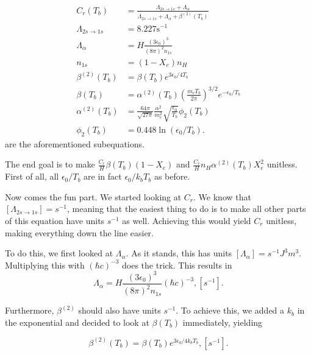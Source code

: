 \documentclass[12pt]{article}
\begin{document}
\begin{align*}\label{eq: peebles components again}
        C_{r}\left(T_{b}\right) &=\frac{\Lambda_{2 s \rightarrow 1 s}+\Lambda_{\alpha}}{\Lambda_{2 s \rightarrow 1 s}+\Lambda_{\alpha}+\beta^{(2)}\left(T_{b}\right)} \\
        \Lambda_{2 s \rightarrow 1 s} &=8.227 \mathrm{s}^{-1} \\
        \Lambda_{\alpha} &=H \frac{\left(3 \epsilon_{0}\right)^{3}}{(8 \pi)^{2} n_{1 s}} \\
        n_{1 s} &=\left(1-X_{e}\right) n_{H} \\
        \beta^{(2)}\left(T_{b}\right) &=\beta\left(T_{b}\right) e^{3 \epsilon_{0} / 4 T_{b}} \\
        \beta\left(T_{b}\right) &=\alpha^{(2)}\left(T_{b}\right)\left(\frac{m_{e} T_{b}}{2 \pi}\right)^{3 / 2} e^{-\epsilon_{0} / T_{b}} \\
        \alpha^{(2)}\left(T_{b}\right) &=\frac{64 \pi}{\sqrt{27 \pi}} \frac{\alpha^{2}}{m_{e}^{2}} \sqrt{\frac{\epsilon_{0}}{T_{b}}} \phi_{2}\left(T_{b}\right) \\
        \phi_{2}\left(T_{b}\right) &=0.448 \ln \left(\epsilon_{0} / T_{b}\right).
\end{align*}
are the aforementioned subequations.

The end goal is to make $\frac{C_r}{H}\beta(T_b)(1-X_e)$ and $\frac{C_r}{H}n_H\alpha^{(2)}(T_b)X_e^2$ unitless. First of all, all $\epsilon_0/T_b$ are in fact $\epsilon_0/k_b T_b$ as before. 

Now comes the fun part. We started looking at $C_r$. We know that $[\Lambda_{2s\rightarrow1s}] = s^{-1}$, meaning that the easiest thing to do is to make all other parts of this equation have units $s^{-1}$ as well. Achieving this would yield $C_r$ unitless, making everything down the line easier. 

To do this, we first looked at $\Lambda_{\alpha}$. As it stands, this has units $[\Lambda_{\alpha}]=s^{-1}J^3m^3$. Multiplying this with $(\hbar c)^{-3}$ does the trick. This results in 
\begin{equation*}
    \Lambda_{\alpha}= H\frac{(3\epsilon_0)^3}{(8\pi)^2 n_{1s}}(\hbar c)^{-3}, [s^{-1}].
\end{equation*}

Furthermore, $\beta^{(2)}$ should also have units $s^{-1}$. To achieve this, we added a $k_b$ in the exponential and decided to look at $\beta(T_b)$ immediately, yielding 

\begin{equation*}
    \beta^{(2)}(T_b) = \beta(T_b)e^{3\epsilon_0/4k_bT_b}, [s^{-1}].
\end{equation*}
\end{document}
